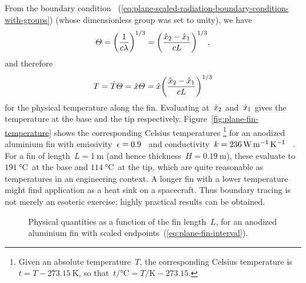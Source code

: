 \begin{figure}
\end{figure}

From the boundary condition~%
  (\ref{eq:plane-scaled-radiation-boundary-condition-with-groups})
(whose dimensionless group was set to unity),
we have
\begin{equation}
  \Theta
    = \roundbr*{\frac{1}{c \lambda}}^{1/3}
    = \roundbr*{\frac{\scaled{x}_2 - \scaled{x}_1}{c L}}^{1/3},
  \label{eq:plane-fin-length-scale}
\end{equation}
and therefore
\begin{equation}
  T = \scaled{T} \Theta
    = \scaled{x} \Theta
    = \scaled{x} \roundbr*{\frac{\scaled{x}_2 - \scaled{x}_1}{c L}}^{1/3}
  \label{eq:plane-fin-temperature}
\end{equation}
for the physical temperature along the fin.
Evaluating at~$\hat{x}_2$ and~$\hat{x}_1$
gives the temperature at the base and the tip respectively.
Figure~\ref{fig:plane-fin-temperature} shows
the corresponding Celsius temperatures%
\footnote{
  Given an absolute temperature~$T$,
  the corresponding Celsius temperature is~$t = T - \SI{273.15}{\kelvin}$,
  so that~$t / \si{\degreeCelsius} = T / \si{\kelvin} - 273.15$.
}
for an anodized aluminium fin
with emissivity~$\epsilon = 0.9$~%
  \cite[Figure~4]{wade-2003-high-emissivity-aluminium-anodizing}
and conductivity~$k = \SI{236}{\watt \per\metre \per\kelvin}$~%
  \cite[Figure~1]{cook-1975-thermal-electrical-conductivity-aluminium}.
For a fin of length~$L = \SI{1}{\metre}$
(and hence thickness~$H = \SI{0.19}{\metre}$),
these evaluate to $\SI{191}{\degreeCelsius}$~at the base
and $\SI{114}{\degreeCelsius}$~at the tip,
which are quite reasonable as temperatures in an engineering context.
A longer fin with a lower temperature might find application
as a heat sink on a spacecraft.
Thus boundary tracing is not merely an esoteric exercise;
highly practical results can be obtained.

\begin{figure}
  \newcommand*{\subfigurewidth}{0.48\textwidth}
  \centering
  \hspace*{\fill}
  \begin{subfigure}[t]{\subfigurewidth}
  \end{subfigure}
    \hfill
  \begin{subfigure}[t]{\subfigurewidth}
  \end{subfigure}
  \hspace*{\fill}
  \caption{
    Physical quantities as a function of the fin length~$L$,
    for an anodized aluminium fin
    with scaled endpoints~(\ref{eq:plane-fin-interval}).
  }
  \label{fig:plane-fin-quantities}
\end{figure}

